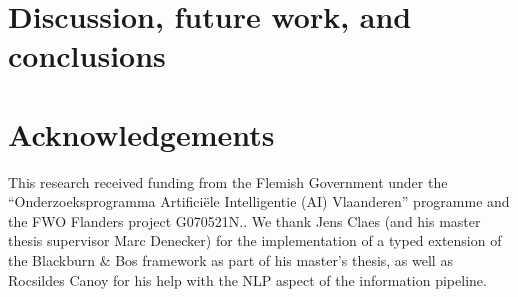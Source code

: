 \documentclass[3p]{elsarticle}
\newcommand\comment[1]{\marginpar{\tiny #1}}
\renewcommand\comment[1]{#1}
\newcommand{\bart}[1]{{\comment{\color{blue}\textsc{BB:}#1}}}
\newcommand{\tias}[1]{{\comment{\color{blue}\textsc{TG:}#1}}}
\newcommand{\emilio}[1]{{\comment{\color{red}\textsc{EG:}#1}}}
\newcommand{\todo}[1]{{\comment{\color{red}\textsc{TODO:}#1}}}
\begin{document}
\section{Discussion, future work, and conclusions}\label{sec:conclusion}










\section*{Acknowledgements}
This research received funding from the Flemish Government under the ``Onderzoeksprogramma Artifici\"ele Intelligentie (AI) Vlaanderen'' programme and the
FWO Flanders project G070521N.. 
We thank Jens Claes (and his master thesis supervisor Marc Denecker) for the implementation of a typed extension of the Blackburn \& Bos framework as part of his master's thesis, as well as Rocsildes Canoy for his help with the NLP aspect of the information pipeline. %



\end{document}

